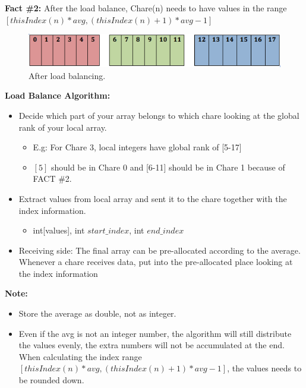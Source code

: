 \documentclass{article}
\begin{document}
\textbf{Fact \#2:}
After the load balance, Chare(n) needs to have values in the range 
$[thisIndex(n)*avg, (thisIndex(n)+1)*avg-1]$\\

\begin{figure}[h]
\centering
\includegraphics[width=\textwidth]{after_balance.png}
\caption{After load balancing.}
\label{prefix}
\end{figure}


\textbf{ Load Balance Algorithm: }
\begin{itemize}
\item Decide which part of your array belongs to which chare looking at the global rank of your local array.
\begin{itemize}
\item E.g: For Chare 3, local integers have global rank of [5-17]
\item $[5]$ should be in Chare 0 and [6-11] should be in Chare 1 because of FACT \#2.
\end{itemize}
\item Extract values from local array and sent it to the chare together with the index information. 
\begin{itemize}
\item int[values], int $start\_index$, int $end\_index$
\end{itemize}


\item Receiving side: The final array can be pre-allocated according to the average. Whenever a chare receives data, put into the pre-allocated place looking at the index information

\end{itemize}



\textbf{Note:}
\begin{itemize}
\item Store the average as double, not as integer.
\item Even if the avg is not an integer number, the algorithm will still distribute the values evenly, the extra numbers will not be accumulated at the end.
When calculating the index range $[thisIndex(n)*avg, (thisIndex(n)+1)*avg-1]$, the values needs to be rounded down.\\
\end{itemize}
\end{document}
